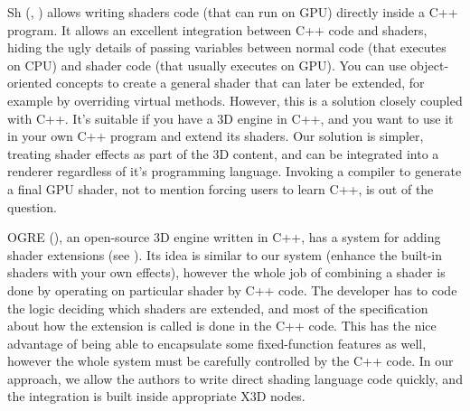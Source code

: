 \documentclass{egpubl}
\begin{document}


Sh (, \cite{sh:book})
allows writing shaders code (that can run on GPU) directly inside a
C++ program.
It allows an excellent
integration between C++ code and shaders, hiding the ugly details of
passing variables between normal code (that executes on CPU) and
shader code (that usually executes on GPU). You can use
object-oriented concepts to create a general shader that can
later be extended, for example by overriding virtual
methods. However, this is a solution closely coupled with C++. It's
suitable if you have a 3D engine in C++, and you want to use it in your
own C++ program and extend its shaders. Our solution is simpler,
treating shader effects as part of the 3D content, and can
be integrated into a renderer regardless of it's programming language.
Invoking a compiler to generate a
final GPU shader, not to mention forcing users to learn C++, is out of the
question.

OGRE (), an open-source 3D engine written in C++, has a system
for adding shader extensions (see \cite{ogre:shader}). Its idea is similar
to our system (enhance the built-in shaders with your own effects),
however the whole job of combining a shader is done by operating
on particular shader by C++ code. The developer has to code
the logic deciding which shaders are extended, and most of the specification
about how the extension is called is done in the C++ code.
This has the nice advantage of being able to encapsulate some fixed-function
features as well, however the whole system must be carefully controlled by
the C++ code. In our approach, we allow the authors to write direct shading
language code quickly, and the integration is built inside appropriate X3D nodes.
\end{document}
